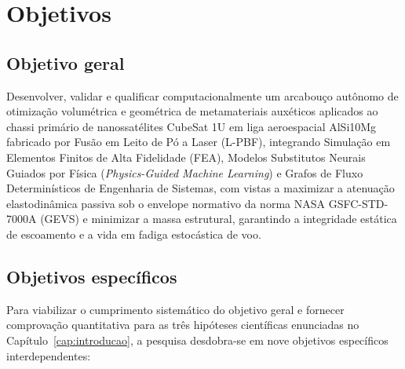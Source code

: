 \chapter{Objetivos}
\label{cap:objetivos}

\section{Objetivo geral}
\label{sec:objetivo-geral}

Desenvolver, validar e qualificar computacionalmente um arcabouço autônomo de otimização volumétrica e geométrica de metamateriais auxéticos aplicados ao chassi primário de nanossatélites CubeSat 1U em liga aeroespacial AlSi10Mg fabricado por Fusão em Leito de Pó a Laser (L-PBF), integrando Simulação em Elementos Finitos de Alta Fidelidade (FEA), Modelos Substitutos Neurais Guiados por Física (\textit{Physics-Guided Machine Learning}) e Grafos de Fluxo Determinísticos de Engenharia de Sistemas, com vistas a maximizar a atenuação elastodinâmica passiva sob o envelope normativo da norma NASA GSFC-STD-7000A (GEVS) e minimizar a massa estrutural, garantindo a integridade estática de escoamento e a vida em fadiga estocástica de voo.

\section{Objetivos específicos}
\label{sec:objetivos-especificos}

Para viabilizar o cumprimento sistemático do objetivo geral e fornecer comprovação quantitativa para as três hipóteses científicas enunciadas no Capítulo~\ref{cap:introducao}, a pesquisa desdobra-se em nove objetivos específicos interdependentes:

